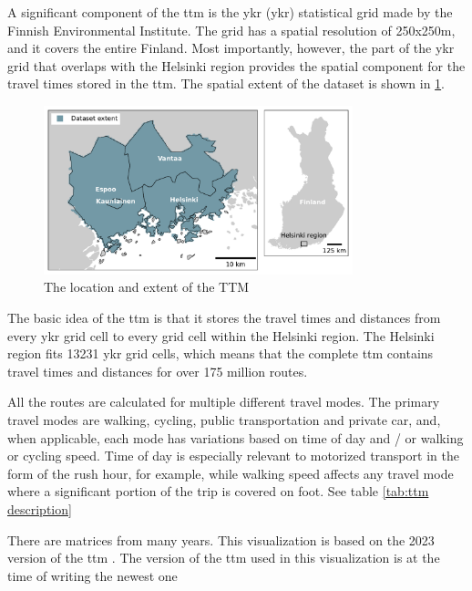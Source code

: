 A significant component of the \acrshort{ttm} is the \acrlong{ykr} (\acrshort{ykr})
statistical grid made by the Finnish Environmental Institute.
The grid has a spatial resolution of 250x250m, and it covers the entire Finland.
Most importantly, however, the part of the \acrshort{ykr} grid that overlaps with
the Helsinki region provides the spatial component for
the travel times stored in the \acrshort{ttm}.
The spatial extent of the dataset is shown in \ref{fig:ttm extent}.

\begin{figure}[H]
	\centering
	\includegraphics[width=0.8\textwidth]{visual/figures/ttm/ttm_extent.pdf}
	\caption{The location and extent of the TTM}
	\label{fig:ttm extent}
\end{figure}

The basic idea of the \acrshort{ttm} is that it stores the travel times and distances
from every \acrshort{ykr} grid cell to every grid cell within the Helsinki region.
The Helsinki region fits 13231 \acrshort{ykr} grid cells,
which means that the complete \acrshort{ttm} contains travel times and distances for
over 175 million routes.

All the routes are calculated for multiple different travel modes.
The primary travel modes are walking, cycling, public transportation and private car,
and, when applicable, each mode has variations based on
time of day and / or walking or cycling speed.
Time of day is especially relevant to motorized transport
in the form of the rush hour, for example,
while walking speed affects any travel mode
where a significant portion of the trip is covered on foot.
See table \ref{tab:ttm description} 


There are matrices from many years.
This visualization is based on the 2023 version of the \acrshort{ttm}
\parencite{fin2023}.
The version of the \acrshort{ttm} used in this visualization is at the time of writing the newest one

